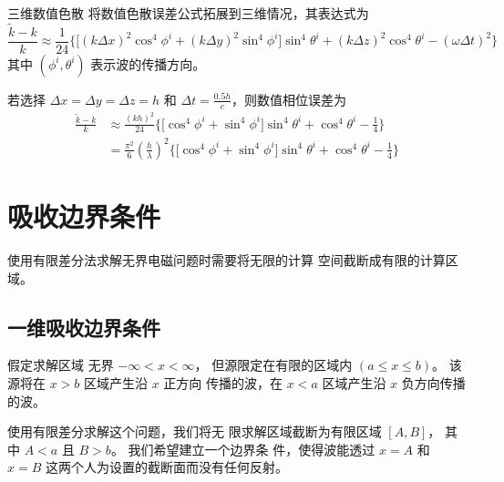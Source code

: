 \begin{theorem}{三维数值色散}
    将数值色散误差公式拓展到三维情况，其表达式为
    \begin{equation}
        \frac{\tilde{k}-k}{k}
        \approx\frac{1}{24}
        \Bigg\{
            \Big[
                (k\Delta x)^2\cos^4\phi^i
                +(k\Delta y)^2\sin^4\phi^i
            \Big]\sin^4\theta^i
            +(k\Delta z)^2\cos^4\theta^i
            -(\omega \Delta t)^2
        \Bigg\}
    \end{equation}
    其中 $(\phi^i,\theta^i)$ 表示波的传播方向。
\end{theorem}

\begin{example}
    若选择 $\Delta x=\Delta y=\Delta z = h$ 和 $\Delta t = \frac{0.5h}{c}$，则数值相位误差为
    \begin{equation*}
        \begin{aligned}
            \frac{\tilde{k}-k}{k}
            &\approx\frac{(kh)^2}{24}
            \Bigg\{
                \Big[
                    \cos^4\phi^i
                    +\sin^4\phi^i
                \Big]\sin^4\theta^i
                +\cos^4\theta^i
                -\frac{1}{4}
            \Bigg\}\\
            &=\frac{\pi^2}{6}\left(\frac{h}{\lambda}\right)^2
            \Bigg\{
                \Big[
                    \cos^4\phi^i
                    +\sin^4\phi^i
                \Big]\sin^4\theta^i
                +\cos^4\theta^i
                -\frac{1}{4}
            \Bigg\}
        \end{aligned}
    \end{equation*}
\end{example}

\section{吸收边界条件}

\par 使用有限差分法求解无界电磁问题时需要将无限的计算
空间截断成有限的计算区域。

\subsection{一维吸收边界条件}

\par 假定求解区域
无界 $-\infty<x<\infty$，
但源限定在有限的区域内 $(a\leq x \leq b)$。
该源将在 $x>b$ 区域产生沿 $x$ 正方向
传播的波，在 $x<a$ 区域产生沿 $x$ 负方向传播的波。
\par 使用有限差分求解这个问题，我们将无
限求解区域截断为有限区域 $[A,B]$，
其中 $A<a$ 且 $B>b$。
我们希望建立一个边界条
件，使得波能透过 $x=A$ 和 $x=B$ 这两个人为设置的截断面而没有任何反射。

